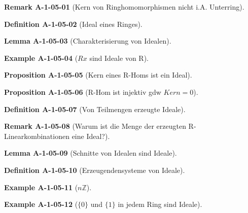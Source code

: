 \documentclass[10pt, letterpaper]{article}
\newcommand{\Z}{\mathbb{Z}}
\newcommand{\CustomHeading}[3]{%
  \par\medskip\noindent%
  \textbf{#1 #2} \textnormal{(#3)}.\enskip%
}
\newenvironment{DEF}[2]{\CustomHeading{Definition}{#1}{#2}}{}
\newenvironment{PROP}[2]{\CustomHeading{Proposition}{#1}{#2}}{}
\newenvironment{LEM}[2]{\CustomHeading{Lemma}{#1}{#2}}{}
\newenvironment{REM}[2]{\CustomHeading{Remark}{#1}{#2}}{}
\newenvironment{EXA}[2]{\CustomHeading{Example}{#1}{#2}}{}
\begin{document}
\begin{REM}{A-1-05-01}{Kern von Ringhomomorphismen nicht i.A. Unterring}
\end{REM}

\begin{DEF}{A-1-05-02}{Ideal eines Ringes}
\end{DEF}

\begin{LEM}{A-1-05-03}{Charakterisierung von Idealen}
\end{LEM}

\begin{EXA}{A-1-05-04}{$Rx$ sind Ideale von R}
\end{EXA}

\begin{PROP}{A-1-05-05}{Kern eines R-Homs ist ein Ideal}
\end{PROP}

\begin{PROP}{A-1-05-06}{R-Hom ist injektiv gdw $Kern = 0$}
\end{PROP}

\begin{DEF}{A-1-05-07}{Von Teilmengen erzeugte Ideale}
\end{DEF}

\begin{REM}{A-1-05-08}{Warum ist die Menge der erzeugten R-Linearkombinationen eine Ideal?}
\end{REM}

\begin{LEM}{A-1-05-09}{Schnitte von Idealen sind Ideale}
\end{LEM}

\begin{DEF}{A-1-05-10}{Erzeugendensysteme von Ideale}
\end{DEF}

\begin{EXA}{A-1-05-11}{$n\Z$}
\end{EXA}

\begin{EXA}{A-1-05-12}{$\{0\}$ und $\{1\}$ in jedem Ring sind Ideale}
\end{EXA}
\end{document}
